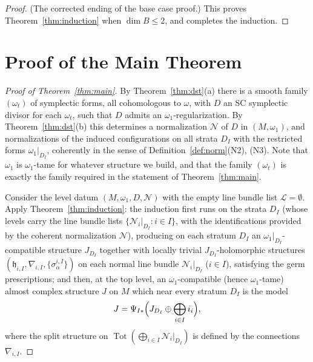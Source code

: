 \documentclass[11pt]{amsart}
\theoremstyle{plain}
\theoremstyle{definition}
\newcommand{\NN}{\mathcal{N}}
\newcommand{\LL}{\mathcal{L}}
\newcommand{\hh}{\mathfrak{h}}
\newcommand{\tot}{\operatorname{Tot}}
\begin{document}
\begin{proof}
(The corrected ending of the base case proof.) This proves
Theorem~\ref{thm:induction} when $\dim B\le 2$, and completes the induction.
\end{proof}

\section{Proof of the Main Theorem}\label{sec:main}

\begin{proof}[Proof of Theorem~\ref{thm:main}]
By Theorem~\ref{thm:dst}(a) there is a smooth family $(\omega_t)$ of
symplectic forms, all cohomologous to $\omega$, with $D$ an SC symplectic
divisor for each $\omega_t$, such that $D$ admits an
$\omega_1$-regularization. By Theorem~\ref{thm:dst}(b) this determines a
normalization $\NN$ of $D$ in $(M,\omega_1)$, and normalizations of the
induced configurations on all strata $D_I$ with the restricted forms
$\omega_1|_{D_I}$, coherently in the sense of Definition~\ref{def:norm}(N2),
(N3). Note that $\omega_1$ is $\omega_1$-tame for whatever structure we
build, and that the family $(\omega_t)$ is exactly the family required in
the statement of Theorem~\ref{thm:main}.

Consider the level datum $(M,\omega_1,D,\NN)$ with the empty line bundle
list $\LL=\emptyset$. Apply Theorem~\ref{thm:induction}: the induction
first runs on the strata $D_I$ (whose levels carry the line bundle lists
$\{\NN_i|_{D_I}:i\in I\}$, with the identifications provided by the
coherent normalization $\NN$), producing on each stratum $D_I$ an
$\omega_1|_{D_I}$-compatible structure $J_{D_I}$ together with locally
trivial $J_{D_I}$-holomorphic structures
$(\hh_{i,I},\nabla_{i,I},\{\sigma^{i,I}_\alpha\})$ on each normal line bundle
$\NN_i|_{D_I}$ ($i\in I$), satisfying the germ prescriptions; and then, at
the top level, an $\omega_1$-compatible (hence $\omega_1$-tame) almost
complex structure $J$ on $M$ which near every stratum $D_I$ is the model
\[
 J=\Psi_{I*}\Bigl(J_{D_I}\oplus\bigoplus_{i\in I}i_i\Bigr),
\]
where the split structure on $\tot(\bigoplus_{i\in I}\NN_i|_{D_I})$ is
defined by the connections $\nabla_{i,I}$.


\end{proof}
\end{document}
